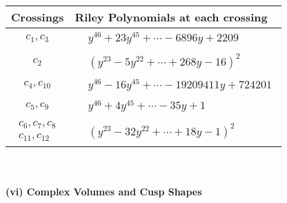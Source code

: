 \documentclass[1p]{elsarticle_modified}
\theoremstyle{definition}
\begin{document}
\begin{tabular}{m{50pt}|m{274pt}}
Crossings & \hspace{64pt}Riley Polynomials at each crossing \\
\hline $$\begin{aligned}c_{1},c_{3}\end{aligned}$$&$\begin{aligned}
&y^{46}+23 y^{45}+\cdots-6896 y+2209
\end{aligned}$\\
\hline $$\begin{aligned}c_{2}\end{aligned}$$&$\begin{aligned}
&(y^{23}-5 y^{22}+\cdots+268 y-16)^{2}
\end{aligned}$\\
\hline $$\begin{aligned}c_{4},c_{10}\end{aligned}$$&$\begin{aligned}
&y^{46}-16 y^{45}+\cdots-19209411 y+724201
\end{aligned}$\\
\hline $$\begin{aligned}c_{5},c_{9}\end{aligned}$$&$\begin{aligned}
&y^{46}+4 y^{45}+\cdots-35 y+1
\end{aligned}$\\
\hline $$\begin{aligned}c_{6},c_{7},c_{8}\\c_{11},c_{12}\end{aligned}$$&$\begin{aligned}
&(y^{23}-32 y^{22}+\cdots+18 y-1)^{2}
\end{aligned}$\\
\hline
\end{tabular}\\~\\
\newpage\flushleft \textbf{(vi) Complex Volumes and Cusp Shapes}
\end{document}
